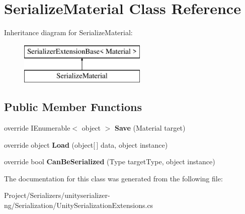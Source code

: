 \hypertarget{class_serialize_material}{}\section{Serialize\+Material Class Reference}
\label{class_serialize_material}
Inheritance diagram for Serialize\+Material\+:\begin{figure}[H]
\begin{center}
\leavevmode
\includegraphics[height=2.000000cm]{class_serialize_material}
\end{center}
\end{figure}
\subsection*{Public Member Functions}
\begin{DoxyCompactItemize}
\item 
\mbox{\label{class_serialize_material_a9478a00c7ed2237f8fd8db4f190bd96c}} 
override I\+Enumerable$<$ object $>$ {\bfseries Save} (Material target)
\item 
\mbox{\label{class_serialize_material_ae371882b5aece27aafec190d488fc97f}} 
override object {\bfseries Load} (object\mbox{[}$\,$\mbox{]} data, object instance)
\item 
\mbox{\label{class_serialize_material_a86d5a8507905179b0d5cc0ca608c552b}} 
override bool {\bfseries Can\+Be\+Serialized} (Type target\+Type, object instance)
\end{DoxyCompactItemize}


The documentation for this class was generated from the following file\+:\begin{DoxyCompactItemize}
\item 
Project/\+Serializers/unityserializer-\/ng/\+Serialization/Unity\+Serialization\+Extensions.\+cs\end{DoxyCompactItemize}
